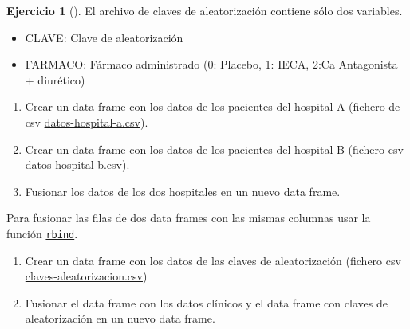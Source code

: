 \documentclass[
  a4paper,
]{scrreport}
\providecommand{\tightlist}{%
  \setlength{\itemsep}{0pt}\setlength{\parskip}{0pt}}\usepackage{longtable,booktabs,array}
\theoremstyle{definition}
\newtheorem{exercise}{Ejercicio}[chapter]
\theoremstyle{remark}
\begin{document}
\begin{exercise}[]
El archivo de claves de aleatorización contiene sólo dos variables.

\begin{itemize}
\tightlist
\item
  CLAVE: Clave de aleatorización
\item
  FARMACO: Fármaco administrado (0: Placebo, 1: IECA, 2:Ca Antagonista +
  diurético)
\end{itemize}

\begin{enumerate}
\def\labelenumi{\alph{enumi}.}
\item
  Crear un data frame con los datos de los pacientes del hospital A
  (fichero de csv
  \href{datos/hipertension/datos-hospital-a.csv}{datos-hospital-a.csv}).
\item
  Crear un data frame con los datos de los pacientes del hospital B
  (fichero csv
  \href{datos/hipertension/datos-hospital-b.csv}{datos-hospital-b.csv}).
\item
  Fusionar los datos de los dos hospitales en un nuevo data frame.
\end{enumerate}

\begin{tcolorbox}[enhanced jigsaw, rightrule=.15mm, toptitle=1mm, colbacktitle=quarto-callout-note-color!10!white, titlerule=0mm, colback=white, leftrule=.75mm, bottomtitle=1mm, colframe=quarto-callout-note-color-frame, breakable, title=\textcolor{quarto-callout-note-color}{\faInfo}\hspace{0.5em}{Ayuda}, arc=.35mm, coltitle=black, opacityback=0, bottomrule=.15mm, opacitybacktitle=0.6, left=2mm, toprule=.15mm]

Para fusionar las filas de dos data frames con las mismas columnas usar
la función
\href{https://aprendeconalf.es/manual-r/03-tipos-datos-estructurados.html\#a\%C3\%B1adir-elementos-a-un-data-frame}{\texttt{rbind}}.

\end{tcolorbox}

\begin{enumerate}
\def\labelenumi{\alph{enumi}.}
\setcounter{enumi}{3}
\item
  Crear un data frame con los datos de las claves de aleatorización
  (fichero csv
  \href{datos/hipertension/claves-aleatorizacion.csv}{claves-aleatorizacion.csv})
\item
  Fusionar el data frame con los datos clínicos y el data frame con
  claves de aleatorización en un nuevo data frame.
\end{enumerate}


\end{exercise}
\end{document}
